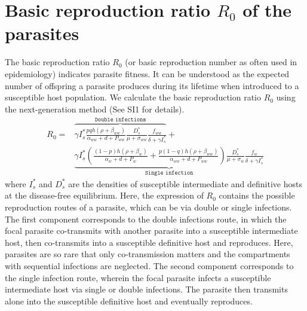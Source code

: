 \documentclass[a4paper]{scrartcl}
\begin{document}
\section*{Basic reproduction ratio $R_0$ of the parasites}

The basic reproduction ratio $R_0$ (or basic reproduction number as often used in epidemiology) indicates parasite fitness. 
It can be understood as the expected number of offspring a parasite produces during its lifetime when introduced to a susceptible host population. 
We calculate the basic reproduction ratio $R_0$ using the next-generation method \citep{Diekmann1990, Diekmann2009, hurford:JRSI:2010} (See SI1 for details).
%
\begin{align}
R_0 = & \overbrace{\gamma I_s^* \frac{p q h (\rho +  \beta_{ww})}{\alpha_{ww} + d + P_{ww}} \frac{D_s^*}{\mu +\sigma_{ww}} \frac{f_{ww}}{\delta +\gamma I_s^*}}^{ \texttt{Double infections}} + \nonumber \\
& \underbrace{\gamma  I_s^* \left( \frac{ (1-p) h (\rho + \beta_w)}{\alpha_w + d + P_w} + \frac{p (1-q) h (\rho + \beta_{ww})}{\alpha_{ww} + d + P_{ww}} \right) \frac{D_s^*}{\mu + \sigma_w} \frac{f_w}{\delta +\gamma  I_s^*}}_{\texttt{Single infection}}
\end{align}
%
where $I_s^*$ and $D_s^*$ are the densities of susceptible intermediate and definitive hosts at the disease-free equilibrium. 
Here, the expression of $R_0$ contains the possible reproduction routes of a parasite, which can be via double or single infections. 
The first component corresponds to the double infections route, in which the focal parasite co-transmits with another parasite into a susceptible intermediate host, then co-transmits into a susceptible definitive host and reproduces. 
Here, parasites are so rare that only co-transmission matters and the compartments with sequential infections are neglected. 
The second component corresponds to the single infection route, wherein the focal parasite infects a susceptible intermediate host via single or double infections. 
The parasite then transmits alone into the susceptible definitive host and eventually reproduces. 
\end{document}
